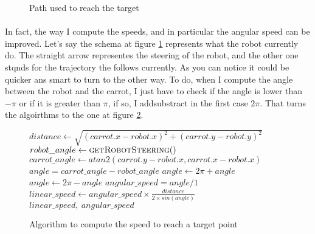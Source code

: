 \begin{figure}[!h]
    \begin{center}
        
    \end{center}
    
    \caption{
        \label{fig:path}
        Path used to reach the target
    }
\end{figure}

\paragraph{}{
    In fact, the way I compute the speeds, and in particular the angular speed can be improved. Let's say the schema at figure \ref{fig:path} represents what the robot currently do. The straight arrow representes the steering of the robot, and the other one stqnds for the trajectory the follows currently. As you can notice it could be quicker ans smart to turn to the other way. To do, when I compute the angle between the robot and the carrot, I just have to check if the angle is lower than $-\pi$ or if it is greater than $\pi$, if so, I add\/substract in the first case $2\pi$. That turns the algoirthms to the one at figure \ref{algo:speeds_smart}.
}

\begin{figure}[!h]
    \begin{algorithmic}
        \State $distance \gets \sqrt{(carrot.x - robot.x)^{2} + (carrot.y - robot.y)^{2}}$
        \State $robot\_angle \gets \Call{getRobotSteering}$
        \State $carrot\_angle \gets atan2(carrot.y - robot.x, carrot.x - robot.x)$
        \State $angle = carrot\_angle - robot\_angle$
            \State $ angle \gets 2\pi + angle $
        \EndIf
            \State $ angle \gets 2\pi - angle $
        \EndIf
        \State $angular\_speed = angle / 1$
        \State $linear\_speed \gets angular\_speed \times \frac{distance}{2 \times sin( angle )} $
        \State \Return $linear\_speed,~angular\_speed$
     \EndFunction
    \end{algorithmic}
    
    \caption{
        \label{algo:speeds_smart}
        Algorithm to compute the speed to reach a target point
    }
\end{figure}

\paragraph{}{
}

